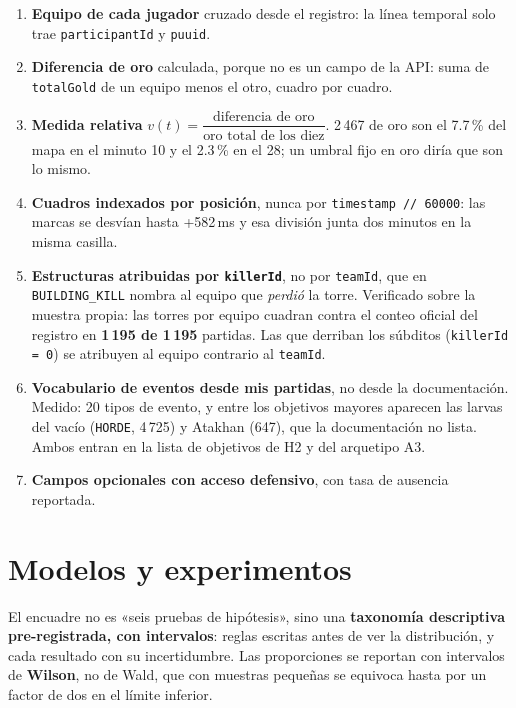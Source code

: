 \documentclass[11pt,letterpaper]{article}
\newcommand{\dato}[1]{\textbf{\textcolor{azul}{#1}}}
\begin{document}
\begin{enumerate}[leftmargin=1.6em,itemsep=.35em]
        exactamente una), y la otra cuenta es un compañero más. Esas 13 partidas
        tampoco son independientes del resto, y se reporta.
  \item \textbf{Equipo de cada jugador} cruzado desde el registro: la línea temporal
        solo trae \texttt{participantId} y \texttt{puuid}.
  \item \textbf{Diferencia de oro} calculada, porque no es un campo de la API: suma de
        \texttt{totalGold} de un equipo menos el otro, cuadro por cuadro.
  \item \textbf{Medida relativa}
        \(v(t) = \dfrac{\text{diferencia de oro}}{\text{oro total de los diez}}\).
        2\,467 de oro son el 7.7\,\% del mapa en el minuto 10 y el 2.3\,\% en el 28;
        un umbral fijo en oro diría que son lo mismo.
  \item \textbf{Cuadros indexados por posición}, nunca por
        \texttt{timestamp // 60000}: las marcas se desvían hasta +582\,ms y esa
        división junta dos minutos en la misma casilla.
  \item \textbf{Estructuras atribuidas por \texttt{killerId}}, no por
        \texttt{teamId}, que en \texttt{BUILDING\_KILL} nombra al equipo que
        \emph{perdió} la torre. Verificado sobre la muestra propia: las torres por
        equipo cuadran contra el conteo oficial del registro en \dato{1\,195 de
        1\,195} partidas. Las que derriban los súbditos (\texttt{killerId = 0}) se
        atribuyen al equipo contrario al \texttt{teamId}.
  \item \textbf{Vocabulario de eventos desde mis partidas}, no desde la
        documentación. Medido: 20 tipos de evento, y entre los objetivos mayores
        aparecen las larvas del vacío (\texttt{HORDE}, 4\,725) y Atakhan (647), que la
        documentación no lista. Ambos entran en la lista de objetivos de H2 y del
        arquetipo A3.
  \item \textbf{Campos opcionales con acceso defensivo}, con tasa de ausencia
        reportada.
\end{enumerate}

\section{Modelos y experimentos}
\label{sec:exp}

El encuadre no es «seis pruebas de hipótesis», sino una \textbf{taxonomía descriptiva
pre-registrada, con intervalos}: reglas escritas antes de ver la distribución, y cada
resultado con su incertidumbre. Las proporciones se reportan con intervalos de
\textbf{Wilson}, no de Wald, que con muestras pequeñas se equivoca hasta por un factor
de dos en el límite inferior.
\end{document}
